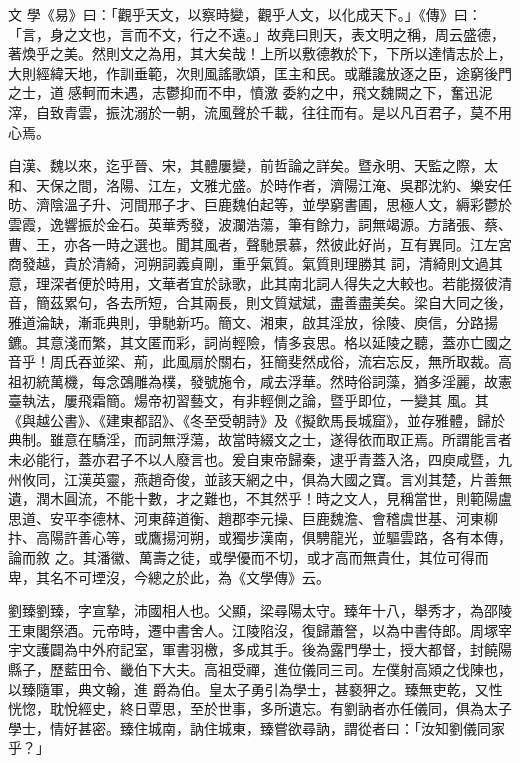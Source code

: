 
\begin{pinyinscope}

 文
 學《易》曰：「觀乎天文，以察時變，觀乎人文，以化成天下。」《傳》曰：「言，身之文也，言而不文，行之不遠。」故堯曰則天，表文明之稱，周云盛德，著煥乎之美。然則文之為用，其大矣哉！上所以敷德教於下，下所以達情志於上，大則經緯天地，作訓垂範，次則風謠歌頌，匡主和民。或離讒放逐之臣，途窮後門之士，道感軻而未遇，志鬱抑而不申，憤激
 委約之中，飛文魏闕之下，奮迅泥滓，自致青雲，振沈溺於一朝，流風聲於千載，往往而有。是以凡百君子，莫不用心焉。



 自漢、魏以來，迄乎晉、宋，其體屢變，前哲論之詳矣。暨永明、天監之際，太和、天保之間，洛陽、江左，文雅尤盛。於時作者，濟陽江淹、吳郡沈約、樂安任昉、濟陰溫子升、河間邢子才、巨鹿魏伯起等，並學窮書圃，思極人文，縟彩鬱於雲霞，逸響振於金石。英華秀發，波瀾浩蕩，筆有餘力，詞無竭源。方諸張、蔡、曹、王，亦各一時之選也。聞其風者，聲馳景慕，然彼此好尚，互有異同。江左宮商發越，貴於清綺，河朔詞義貞剛，重乎氣質。氣質則理勝其
 詞，清綺則文過其意，理深者便於時用，文華者宜於詠歌，此其南北詞人得失之大較也。若能掇彼清音，簡茲累句，各去所短，合其兩長，則文質斌斌，盡善盡美矣。梁自大同之後，雅道淪缺，漸乖典則，爭馳新巧。簡文、湘東，啟其淫放，徐陵、庾信，分路揚鑣。其意淺而繁，其文匿而彩，詞尚輕險，情多哀思。格以延陵之聽，蓋亦亡國之音乎！周氏吞並梁、荊，此風扇於關右，狂簡斐然成俗，流宕忘反，無所取裁。高祖初統萬機，每念鵶雕為樸，發號施令，咸去浮華。然時俗詞藻，猶多淫麗，故憲臺執法，屢飛霜簡。煬帝初習藝文，有非輕側之論，暨乎即位，一變其
 風。其《與越公書》、《建東都詔》、《冬至受朝詩》及《擬飲馬長城窟》，並存雅體，歸於典制。雖意在驕淫，而詞無浮蕩，故當時綴文之士，遂得依而取正焉。所謂能言者未必能行，蓋亦君子不以人廢言也。爰自東帝歸秦，逮乎青蓋入洛，四庾咸暨，九州攸同，江漢英靈，燕趙奇俊，並該天網之中，俱為大國之寶。言刈其楚，片善無遺，潤木圓流，不能十數，才之難也，不其然乎！時之文人，見稱當世，則範陽盧思道、安平李德林、河東薛道衡、趙郡李元操、巨鹿魏澹、會稽虞世基、河東柳抃、高陽許善心等，或鷹揚河朔，或獨步漢南，俱騁龍光，並驅雲路，各有本傳，論而敘
 之。其潘徽、萬壽之徒，或學優而不切，或才高而無貴仕，其位可得而卑，其名不可堙沒，今總之於此，為《文學傳》云。



 劉臻劉臻，字宣摯，沛國相人也。父顯，梁尋陽太守。臻年十八，舉秀才，為邵陵王東閣祭酒。元帝時，遷中書舍人。江陵陷沒，復歸蕭詧，以為中書侍郎。周塚宰宇文護闢為中外府記室，軍書羽檄，多成其手。後為露門學士，授大都督，封饒陽縣子，歷藍田令、畿伯下大夫。高祖受禪，進位儀同三司。左僕射高熲之伐陳也，以臻隨軍，典文翰，進
 爵為伯。皇太子勇引為學士，甚褻狎之。臻無吏乾，又性恍惚，耽悅經史，終日覃思，至於世事，多所遺忘。有劉訥者亦任儀同，俱為太子學士，情好甚密。臻住城南，訥住城東，臻嘗欲尋訥，謂從者曰：「汝知劉儀同家乎？」




\end{pinyinscope}
